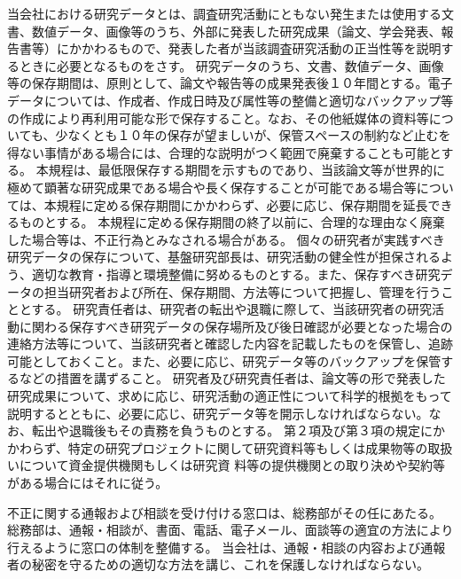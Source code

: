 \documentclass[10pt,a4paper,uplatex]{jsarticle}
\begin{document}
当会社における研究データとは、調査研究活動にともない発生または使用する文書、数値データ、画像等のうち、外部に発表した研究成果（論文、学会発表、報告書等）にかかわるもので、発表した者が当該調査研究活動の正当性等を説明するときに必要となるものをさす。
\term 研究データのうち、文書、数値データ、画像等の保存期間は、原則として、論文や報告等の成果発表後１０年間とする。電子データについては、作成者、作成日時及び属性等の整備と適切なバックアップ等の作成により再利用可能な形で保存すること。なお、その他紙媒体の資料等についても、少なくとも１０年の保存が望ましいが、保管スペースの制約など止むを得ない事情がある場合には、合理的な説明がつく範囲で廃棄することも可能とする。 
\term 本規程は、最低限保存する期間を示すものであり、当該論文等が世界的に極めて顕著な研究成果である場合や長く保存することが可能である場合等については、本規程に定める保存期間にかかわらず、必要に応じ、保存期間を延長できるものとする。
\term 本規程に定める保存期間の終了以前に、合理的な理由なく廃棄した場合等は、不正行為とみなされる場合がある。
\term 個々の研究者が実践すべき研究データの保存について、基盤研究部長は、研究活動の健全性が担保されるよう、適切な教育・指導と環境整備に努めるものとする。また、保存すべき研究データの担当研究者および所在、保存期間、方法等について把握し、管理を行うこととする。
\term 研究責任者は、研究者の転出や退職に際して、当該研究者の研究活動に関わる保存すべき研究データの保存場所及び後日確認が必要となった場合の連絡方法等について、当該研究者と確認した内容を記載したものを保管し、追跡可能としておくこと。また、必要に応じ、研究データ等のバックアップを保管するなどの措置を講ずること。
\term 研究者及び研究責任者は、論文等の形で発表した研究成果について、求めに応じ、研究活動の適正性について科学的根拠をもって説明するとともに、必要に応じ、研究データ等を開示しなければならない。なお、転出や退職後もその責務を負うものとする。
\term 第２項及び第３項の規定にかかわらず、特定の研究プロジェクトに関して研究資料等もしくは成果物等の取扱いについて資金提供機関もしくは研究資
料等の提供機関との取り決めや契約等がある場合にはそれに従う。

不正に関する通報および相談を受け付ける窓口は、総務部がその任にあたる。
\term 総務部は、通報・相談が、書面、電話、電子メール、面談等の適宜の方法により行えるように窓口の体制を整備する。
\term 当会社は、通報・相談の内容および通報者の秘密を守るための適切な方法を講じ、これを保護しなければならない。
\end{document}

